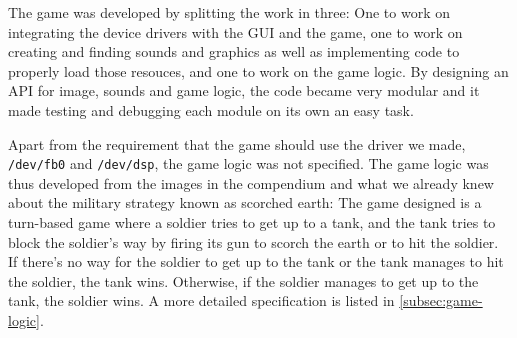 The game was developed by splitting the work in three: One to work on
integrating the device drivers with the GUI and the game, one to work on
creating and finding sounds and graphics as well as implementing code to
properly load those resouces, and one to work on the game logic. By
designing an API for image, sounds and game logic, the code became
very modular and it made testing and debugging each module on
its own an easy task.

Apart from the requirement that the game should use the driver we made,
\texttt{/dev/fb0} and \texttt{/dev/dsp}, the game logic was not
specified. The game logic was thus developed from the images in the
compendium\cite{comp} and what we already knew about the military
strategy known as scorched earth: The game designed is a turn-based game
where a soldier tries to get up to a tank, and the tank tries to block
the soldier's way by firing its gun to scorch the earth or to hit the
soldier. If there's no way for the soldier to get up to the tank or the
tank manages to hit the soldier, the tank wins. Otherwise, if the
soldier manages to get up to the tank, the soldier wins. A more detailed
specification is listed in \ref{subsec:game-logic}.

